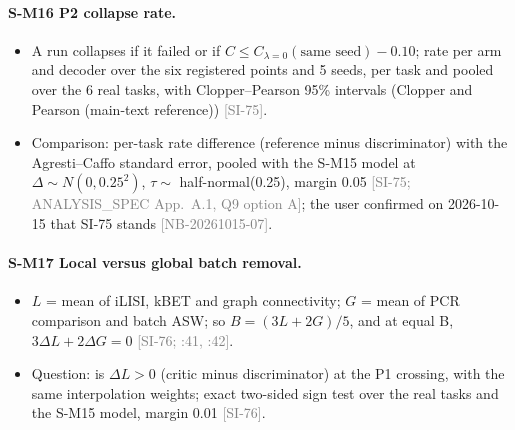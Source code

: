 \documentclass[11pt]{article}
\newcommand{\src}[1]{{\scriptsize\textcolor{gray}{[#1]}}}
\begin{document}
\paragraph{S-M16 P2 collapse rate.}
\begin{itemize}
\item A run collapses if it failed or if $C \leq C_{\lambda = 0}(\text{same seed}) - 0.10$; rate per arm and decoder over the six registered points and 5 seeds, per task and pooled over the 6 real tasks, with Clopper--Pearson 95\% intervals (Clopper and Pearson (main-text reference)) \src{SI-75}.
\item Comparison: per-task rate difference (reference minus discriminator) with the Agresti--Caffo standard error, pooled with the S-M15 model at $\Delta \sim N(0, 0.25^2)$, $\tau \sim$ half-normal(0.25), margin 0.05 \src{SI-75; ANALYSIS\_SPEC App.~A.1, Q9 option A}; the user confirmed on 2026-10-15 that SI-75 stands \src{NB-20261015-07}.
\end{itemize}
\paragraph{S-M17 Local versus global batch removal.}
\begin{itemize}
\item $L$ = mean of iLISI, kBET and graph connectivity; $G$ = mean of PCR comparison and batch ASW; so $B = (3L + 2G)/5$, and at equal B, $3\Delta L + 2\Delta G = 0$ \src{SI-76; :41, :42}.
\item Question: is $\Delta L > 0$ (critic minus discriminator) at the P1 crossing, with the same interpolation weights; exact two-sided sign test over the real tasks and the S-M15 model, margin 0.01 \src{SI-76}.
\end{itemize}
\end{document}
